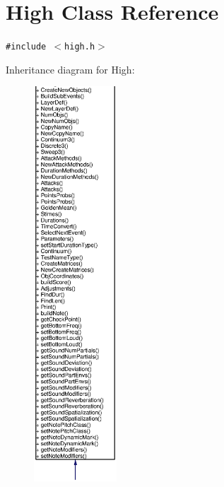 \section{High Class Reference}
\label{classHigh}
{\tt \#include $<$high.h$>$}

Inheritance diagram for High:\begin{figure}[H]
\begin{center}
\leavevmode
\includegraphics[width=88pt]{classHigh__inherit__graph}
\end{center}
\end{figure}
